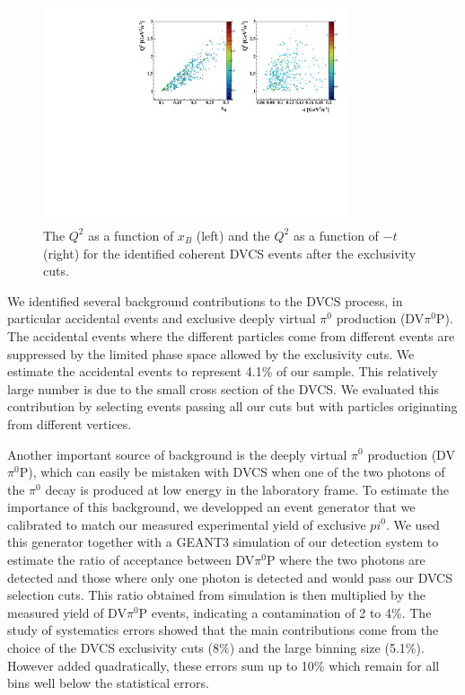 \documentclass[nofootinbib,twocolumn,showpacs,prl,superscriptaddress,secnumarabic,amssymb,nobibnotes,aps,floatfix]{revtex4}
\begin{document}
\begin{figure}[tb]
\hspace{-0.45cm}
\includegraphics[width=9.0cm]{figs/Q2_xB_t_Coh.pdf}
\caption{The $Q^{2}$ as a function of $x_{B}$ (left) and the $Q^{2}$ as a 
function of $-t$ (right) for the identified coherent DVCS events after the 
exclusivity cuts.}
\label{fig:kin-coverage}
\end{figure}





We identified several background contributions to the DVCS process, in 
particular accidental events and exclusive deeply virtual $\pi^0$ production 
(DV$\pi^0$P). The accidental
events where the different particles come from different events are 
suppressed by the limited phase space allowed by the exclusivity cuts. We 
estimate the accidental events to represent 4.1\% of our sample. This 
relatively large number is due to the small cross section of the DVCS. We 
evaluated this contribution by selecting events passing all our cuts but with 
particles originating from different vertices. 

Another important source of background is the deeply virtual 
$\pi^0$ production (DV$\pi^0$P), which can easily be mistaken
with DVCS when one of the two photons of the $\pi^0$ decay is produced at
low energy in the laboratory frame. To estimate the importance of
this background, we developped an event generator 
that we calibrated to match our measured experimental yield of exclusive 
$pi^0$. We used this generator together 
with a GEANT3 simulation of our detection system to estimate the ratio 
of acceptance between DV$\pi^0$P where the two photons are detected and those
where only one photon is detected and would pass our 
DVCS selection cuts. This ratio obtained from simulation is then multiplied by 
the measured yield of DV$\pi^0$P events, indicating a contamination of 2 to 4\%. 
The study of systematics errors showed that the main contributions come from 
the choice of the DVCS exclusivity cuts (8\%) and the large binning size 
(5.1\%). However added quadratically, these errors sum up to 10\% which remain 
for all bins well below the statistical errors.
\end{document}
